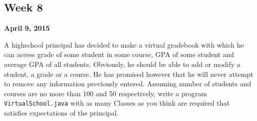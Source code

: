 \documentclass[12pt,letterpaper,twoside]{article}
\begin{document}


\subsection*{Week 8}
\hfill \textbf{April 9, 2015}

A highschool principal has decided to make a virtual gradebook with which he can access grade of some student in some course, GPA of some student and average GPA of all students.
Obviously, he should be able to add or modify a student, a grade or a course.
He has promised however that he will never attempt to remove any information previously entered.
Assuming number of students and courses are no more than 100 and 50 respectively, write a program \texttt{VirtualSchool.java} with as many Classes as you think are required that satisfies expectations of the principal.
\end{document}
